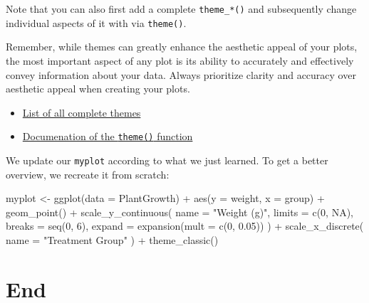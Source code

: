 \documentclass[
  letterpaper,
  DIV=11,
  numbers=noendperiod]{scrartcl}
\newenvironment{Shaded}{\begin{snugshade}}{\end{snugshade}}
\newcommand{\AttributeTok}[1]{\textcolor[rgb]{0.40,0.45,0.13}{#1}}
\newcommand{\ConstantTok}[1]{\textcolor[rgb]{0.56,0.35,0.01}{#1}}
\newcommand{\DecValTok}[1]{\textcolor[rgb]{0.68,0.00,0.00}{#1}}
\newcommand{\FloatTok}[1]{\textcolor[rgb]{0.68,0.00,0.00}{#1}}
\newcommand{\FunctionTok}[1]{\textcolor[rgb]{0.28,0.35,0.67}{#1}}
\newcommand{\NormalTok}[1]{\textcolor[rgb]{0.00,0.23,0.31}{#1}}
\newcommand{\OtherTok}[1]{\textcolor[rgb]{0.00,0.23,0.31}{#1}}
\newcommand{\SpecialCharTok}[1]{\textcolor[rgb]{0.37,0.37,0.37}{#1}}
\newcommand{\StringTok}[1]{\textcolor[rgb]{0.13,0.47,0.30}{#1}}
\providecommand{\tightlist}{%
  \setlength{\itemsep}{0pt}\setlength{\parskip}{0pt}}\usepackage{longtable,booktabs,array}
\begin{document}
Note that you can also first add a complete \texttt{theme\_*()} and
subsequently change individual aspects of it with via \texttt{theme()}.

Remember, while themes can greatly enhance the aesthetic appeal of your
plots, the most important aspect of any plot is its ability to
accurately and effectively convey information about your data. Always
prioritize clarity and accuracy over aesthetic appeal when creating your
plots.

\begin{itemize}
\tightlist
\item
  \href{https://ggplot2.tidyverse.org/reference/ggtheme.html}{List of
  all complete themes}
\item
  \href{https://ggplot2.tidyverse.org/reference/theme.html}{Documenation
  of the \texttt{theme()} function}
\end{itemize}

We update our \texttt{myplot} according to what we just learned. To get
a better overview, we recreate it from scratch:

\begin{Shaded}
\begin{Highlighting}[]
\NormalTok{myplot }\OtherTok{\textless{}{-}} \FunctionTok{ggplot}\NormalTok{(}\AttributeTok{data =}\NormalTok{ PlantGrowth) }\SpecialCharTok{+}
  \FunctionTok{aes}\NormalTok{(}\AttributeTok{y =}\NormalTok{ weight, }\AttributeTok{x =}\NormalTok{ group) }\SpecialCharTok{+}
  \FunctionTok{geom\_point}\NormalTok{() }\SpecialCharTok{+}
  \FunctionTok{scale\_y\_continuous}\NormalTok{(}
    \AttributeTok{name =} \StringTok{"Weight (g)"}\NormalTok{,}
    \AttributeTok{limits =} \FunctionTok{c}\NormalTok{(}\DecValTok{0}\NormalTok{, }\ConstantTok{NA}\NormalTok{),}
    \AttributeTok{breaks =} \FunctionTok{seq}\NormalTok{(}\DecValTok{0}\NormalTok{, }\DecValTok{6}\NormalTok{),}
    \AttributeTok{expand =} \FunctionTok{expansion}\NormalTok{(}\AttributeTok{mult =} \FunctionTok{c}\NormalTok{(}\DecValTok{0}\NormalTok{, }\FloatTok{0.05}\NormalTok{))}
\NormalTok{  ) }\SpecialCharTok{+}
  \FunctionTok{scale\_x\_discrete}\NormalTok{(}
    \AttributeTok{name =} \StringTok{"Treatment Group"}
\NormalTok{  ) }\SpecialCharTok{+}
  \FunctionTok{theme\_classic}\NormalTok{()}
\end{Highlighting}
\end{Shaded}

\hypertarget{end}{%
\section*{End}\label{end}}
\end{document}
